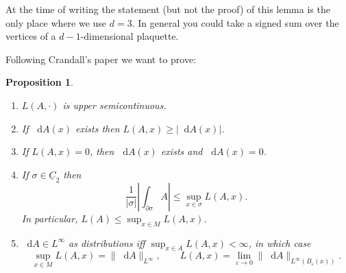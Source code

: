 \documentclass[reqno,11pt]{amsart}
\newcommand*\dif{\mathop{}\!\mathrm{d}}
\newcommand{\Chain}{\underline C}
\newtheorem{proposition}[theorem]{Proposition}
\theoremstyle{definition}
\numberwithin{equation}{section}
\begin{document}
At the time of writing the statement (but not the proof) of this lemma is the only place where we use $d = 3$.
In general you could take a signed sum over the vertices of a $d-1$-dimensional plaquette.

Following Crandall's paper we want to prove:

\begin{proposition}
\begin{enumerate}
\item $L(A, \cdot)$ is upper semicontinuous.
\item If $\dif A(x)$ exists then $L(A, x) \geq |\dif A(x)|$.
\item If $L(A, x) = 0$, then $\dif A(x)$ exists and $\dif A(x) = 0$.
\item If $\sigma \in \Chain_2$ then 
$$\frac{1}{|\sigma|} \left|\int_{\partial \sigma} A\right| \leq \sup_{x \in \sigma} L(A, x).$$
In particular, $L(A) \leq \sup_{x \in M} L(A, x)$.
\item $\dif A \in L^\infty$ as distributions iff $\sup_{x \in A} L(A, x) < \infty$, in which case 
$$\sup_{x \in M} L(A, x) = \|\dif A\|_{L^\infty}, \qquad L(A, x) = \lim_{\varepsilon \to 0} \|\dif A\|_{L^\infty(B_\varepsilon(x))}.$$
\end{enumerate}
\end{proposition}
\end{document}
